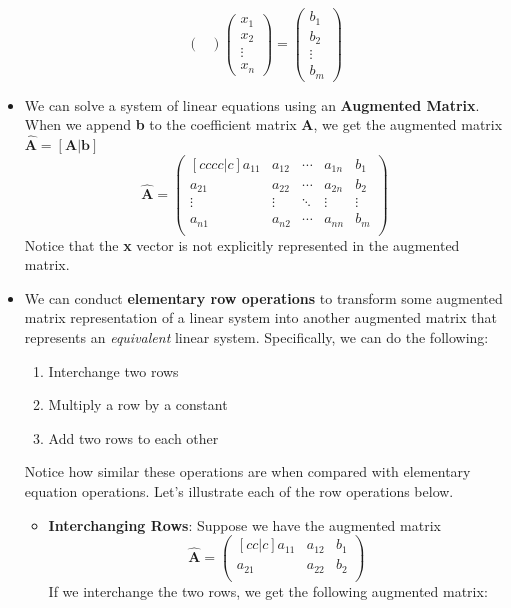 \documentclass[11pt]{article}
\theoremstyle{definition}
\theoremstyle{remark}
\begin{document}
\begin{itemize}
$$\begin{pmatrix}
\end{pmatrix}
\begin{pmatrix}
x_1 \\
x_2 \\
\vdots \\
x_n
\end{pmatrix}
 =
\begin{pmatrix}
b_1 \\
b_2 \\
\vdots \\
b_m
\end{pmatrix}
$$
\item We can solve a system of linear equations using an \textbf{Augmented Matrix}. When we append \textbf{b} to the coefficient matrix \textbf{A}, we get the augmented matrix $\widehat{\mathbf{A}} = [\mathbf{A}|\mathbf{b}]$
$$
\widehat{\mathbf{A}} =
\begin{pmatrix}[cccc|c]
a_{11}&a_{12}&\cdots&a_{1n} & b_1 \\
a_{21}&a_{22}&\cdots&a_{2n} & b_2 \\
\vdots&\vdots&\ddots&\vdots & \vdots \\
a_{n1}&a_{n2}&\cdots&a_{nn} & b_m \\
\end{pmatrix}
$$
Notice that the \textbf{x} vector is not explicitly represented in the augmented matrix. 
\item We can conduct \textbf{elementary row operations} to transform some augmented matrix representation of a linear system into another augmented matrix that represents an \textit{equivalent} linear system. Specifically, we can do the following:
\begin{enumerate}
\item Interchange two rows 
\item Multiply a row by a constant
\item Add two rows to each other
\end{enumerate}
Notice how similar these operations are when compared with elementary equation operations. Let's illustrate each of the row operations below.
\begin{itemize}
\item \textbf{Interchanging Rows}: Suppose we have the augmented matrix
$$
\widehat{\mathbf{A}} =
\begin{pmatrix}[cc|c]
a_{11}&a_{12} & b_1 \\
a_{21}&a_{22} & b_2 \\
\end{pmatrix}
$$
If we interchange the two rows, we get the following augmented matrix: 

\end{itemize}
\end{itemize}
\end{document}
